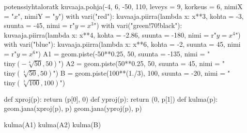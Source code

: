 \begin{luoKuva}{potenssiyhtaloratk}
	kuvaaja.pohja(-4, 6, -50, 110, leveys = 9, korkeus = 6, nimiX = "$x$", nimiY = "$y$")
	with vari("red"): kuvaaja.piirra(lambda x: x**3, kohta = -3, suunta = -45, nimi = r"$y = x^3$")
	with vari("green!70!black"): kuvaaja.piirra(lambda x: x**4, kohta = -2.86, suunta = -180, nimi = r"$y = x^4$")
	with vari("blue"): kuvaaja.piirra(lambda x: x**6, kohta = -2, suunta = 45, nimi = r"$y = x^6$")
	A1 = geom.piste(-50**0.25, 50, suunta = -135, nimi = "\\tiny$(-\sqrt[4]{50}, 50)$")
	A2 = geom.piste(50**0.25, 50, suunta = 45, nimi = "\\tiny$(\sqrt[4]{50}, 50)$")
	B = geom.piste(100**(1./3), 100, suunta = -20, nimi = "\\tiny$(\sqrt[3]{100}, 100)$")
	
	def xproj(p): return (p[0], 0)
	def yproj(p): return (0, p[1])
	def kulma(p):
		geom.jana(xproj(p), p)
		geom.jana(yproj(p), p)
	
	kulma(A1)
	kulma(A2)
	kulma(B)
\end{luoKuva}
\begin{esimerkki}
	\begin{center}
	\end{center}
\end{esimerkki}

